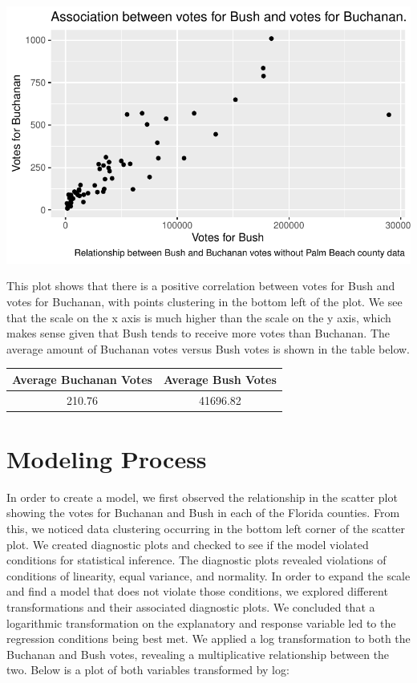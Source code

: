 \documentclass[
  letterpaper,
  DIV=11,
  numbers=noendperiod]{scrartcl}
\begin{document}
\includegraphics{case_study_1_files/figure-pdf/unnamed-chunk-2-1.pdf}

This plot shows that there is a positive correlation between votes for
Bush and votes for Buchanan, with points clustering in the bottom left
of the plot. We see that the scale on the x axis is much higher than the
scale on the y axis, which makes sense given that Bush tends to receive
more votes than Buchanan. The average amount of Buchanan votes versus
Bush votes is shown in the table below.

\begin{table}[H]
\centering
\begin{tabular}[t]{cc}
\toprule
Average Buchanan Votes & Average Bush Votes\\
\midrule
210.76 & 41696.82\\
\bottomrule
\end{tabular}
\end{table}

\hypertarget{modeling-process}{%
\section{Modeling Process}\label{modeling-process}}

In order to create a model, we first observed the relationship in the
scatter plot showing the votes for Buchanan and Bush in each of the
Florida counties. From this, we noticed data clustering occurring in the
bottom left corner of the scatter plot. We created diagnostic plots and
checked to see if the model violated conditions for statistical
inference. The diagnostic plots revealed violations of conditions of
linearity, equal variance, and normality. In order to expand the scale
and find a model that does not violate those conditions, we explored
different transformations and their associated diagnostic plots. We
concluded that a logarithmic transformation on the explanatory and
response variable led to the regression conditions being best met. We
applied a log transformation to both the Buchanan and Bush votes,
revealing a multiplicative relationship between the two. Below is a plot
of both variables transformed by log:
\end{document}
